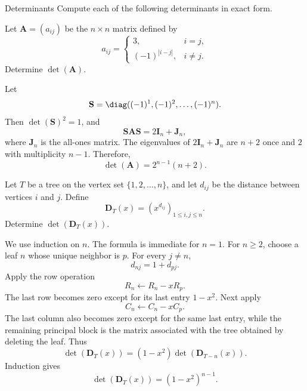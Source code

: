     \begin{expectedproblemgroup}{Determinants}
        Compute each of the following determinants in exact form.

        \begin{expectedsubproblem}
            Let $\mathbf{A}=(a_{ij})$ be the $n\times n$ matrix defined by
            \[
                a_{ij}
                =
                \begin{cases}
                    3, & i=j,\\
                    (-1)^{|i-j|}, & i\neq j.
                \end{cases}
            \]
            Determine $\det(\mathbf{A})$.
        \end{expectedsubproblem}

        \begin{expectedsubsolution}
            Let
            \[
                \mathbf{S}=\diag((-1)^1,(-1)^2,\ldots,(-1)^n).
            \]
            Then $\det(\mathbf{S})^2=1$, and
            \[
                \mathbf{S}\mathbf{A}\mathbf{S}
                =
                2\mathbf{I}_n+\mathbf{J}_n,
            \]
            where $\mathbf{J}_n$ is the all-ones matrix. The eigenvalues of
            $2\mathbf{I}_n+\mathbf{J}_n$ are $n+2$ once and $2$ with multiplicity
            $n-1$. Therefore,
            \[
                \boxed{\det(\mathbf{A})=2^{n-1}(n+2)}.
            \]
        \end{expectedsubsolution}

        \begin{expectedsubproblem}
            Let $T$ be a tree on the vertex set $\{1,2,\ldots,n\}$, and let
            $d_{ij}$ be the distance between vertices $i$ and $j$. Define
            \[
                \mathbf{D}_T(x)=\left(x^{d_{ij}}\right)_{1\leq i,j\leq n}.
            \]
            Determine $\det(\mathbf{D}_T(x))$.
        \end{expectedsubproblem}

        \begin{expectedsubsolution}
            We use induction on $n$. The formula is immediate for $n=1$. For
            $n\geq2$, choose a leaf $n$ whose unique neighbor is $p$. For every
            $j\neq n$,
            \[
                d_{nj}=1+d_{pj}.
            \]
            Apply the row operation
            \[
                R_n\longleftarrow R_n-xR_p.
            \]
            The last row becomes zero except for its last entry $1-x^2$. Next apply
            \[
                C_n\longleftarrow C_n-xC_p.
            \]
            The last column also becomes zero except for the same last entry, while
            the remaining principal block is the matrix associated with the tree
            obtained by deleting the leaf. Thus
            \[
                \det(\mathbf{D}_T(x))
                =
                (1-x^2)\det(\mathbf{D}_{T-n}(x)).
            \]
            Induction gives
            \[
                \boxed{
                    \det(\mathbf{D}_T(x))=(1-x^2)^{n-1}
                }.
            \]
        \end{expectedsubsolution}


\end{expectedproblemgroup}

